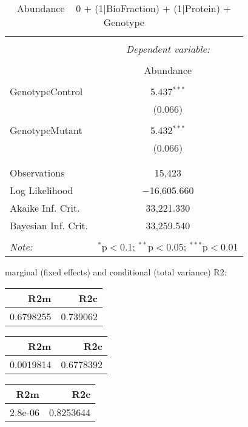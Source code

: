 \documentclass[11pt]{report}
\begin{document}
\begin{table}[!htbp] \centering 
  \caption{Abundance ~ 0 + (1|BioFraction) + (1|Protein) + Genotype} 
  \label{} 
\begin{tabular}{@{\extracolsep{5pt}}lc} 
\\[-1.8ex]\hline 
\hline \\[-1.8ex] 
 & \multicolumn{1}{c}{\textit{Dependent variable:}} \\ 
\cline{2-2} 
\\[-1.8ex] & Abundance \\ 
\hline \\[-1.8ex] 
 GenotypeControl & 5.437$^{***}$ \\ 
  & (0.066) \\ 
  & \\ 
 GenotypeMutant & 5.432$^{***}$ \\ 
  & (0.066) \\ 
  & \\ 
\hline \\[-1.8ex] 
Observations & 15,423 \\ 
Log Likelihood & $-$16,605.660 \\ 
Akaike Inf. Crit. & 33,221.330 \\ 
Bayesian Inf. Crit. & 33,259.540 \\ 
\hline 
\hline \\[-1.8ex] 
\textit{Note:}  & \multicolumn{1}{r}{$^{*}$p$<$0.1; $^{**}$p$<$0.05; $^{***}$p$<$0.01} \\ 
\end{tabular} 
\end{table} 
marginal (fixed effects) and conditional (total variance) R2:

\begin{tabular}{r|r}
\hline
R2m & R2c\\
\hline
0.6798255 & 0.739062\\
\hline
\end{tabular}

\begin{tabular}{r|r}
\hline
R2m & R2c\\
\hline
0.0019814 & 0.6778392\\
\hline
\end{tabular}

\begin{tabular}{r|r}
\hline
R2m & R2c\\
\hline
2.8e-06 & 0.8253644\\
\hline
\end{tabular}
\end{document}
